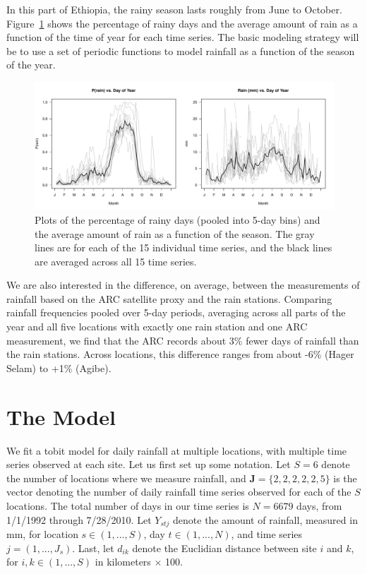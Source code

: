 \documentclass[11pt]{article}
\def\bJ{\pmb{J}}
\begin{document}
In this part of Ethiopia, the rainy season lasts roughly from June to October. Figure~\ref{fig_eda} shows the percentage of rainy days and the average amount of rain as a function of the time of year for each time series. The basic modeling strategy will be to use a set of periodic functions to model rainfall as a function of the season of the year.
\begin{figure}[ht]
\begin{center}
\includegraphics[width=6.5in]{fig_eda.pdf}
\caption{Plots of the percentage of rainy days (pooled into 5-day bins) and the average amount of rain as a function of the season. The gray lines are for each of the 15 individual time series, and the black lines are averaged across all 15 time series.}
\label{fig_eda}
\end{center}
\end{figure}

We are also interested in the difference, on average, between the measurements of rainfall based on the ARC satellite proxy and the rain stations. Comparing rainfall frequencies pooled over 5-day periods, averaging across all parts of the year and all five locations with exactly one rain station and one ARC measurement, we find that the ARC records about 3\% fewer days of rainfall than the rain stations. Across locations, this difference ranges from about -6\% (Hager Selam) to  +1\% (Agibe).



\section{The Model}\label{sec:model}
We fit a tobit model for daily rainfall at multiple locations, with multiple time series observed at each site. Let us first set up some notation. Let $S=6$ denote the number of locations where we measure rainfall, and $\bJ = \{2,2,2,2,2,5\}$ is the vector denoting the number of daily rainfall time series observed for each of the $S$ locations. The total number of days in our time series is $N=6679$ days, from 1/1/1992 through 7/28/2010. Let $Y_{stj}$ denote the amount of rainfall, measured in mm, for location $s \in (1,...,S)$, day $t \in (1,...,N)$, and time series $j = (1,...,J_s)$. Last, let $d_{ik}$ denote the Euclidian distance between site $i$ and $k$, for $i,k \in (1,...,S)$ in kilometers $\times$ 100.
\end{document}
